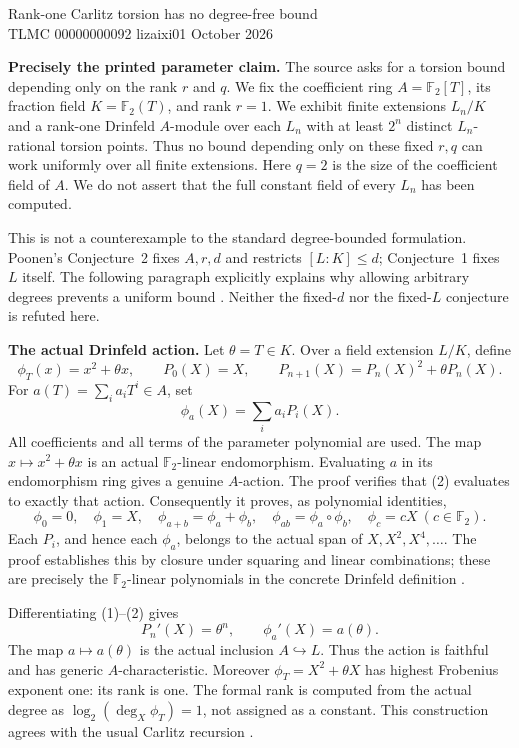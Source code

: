\documentclass[10pt,a4paper]{article}
\begin{document}
\begin{center}
{\Large Rank-one Carlitz torsion has no degree-free bound}\\[4pt]
TLMC 00000000092 \quad lizaixi01  October 2026
\end{center}

\textbf{Precisely the printed parameter claim.}
The source asks for a torsion bound depending only on the rank $r$ and $q$.
We fix the coefficient ring $A=\mathbb F_2[T]$, its fraction field
$K=\mathbb F_2(T)$, and rank $r=1$. We exhibit finite extensions $L_n/K$
and a rank-one Drinfeld $A$-module over each $L_n$ with at least $2^n$
distinct $L_n$-rational torsion points. Thus no bound depending only on
these fixed $r,q$ can work uniformly over all finite extensions.
Here $q=2$ is the size of the coefficient field of $A$. We do not assert
that the full constant field of every $L_n$ has been computed.

This is not a counterexample to the standard degree-bounded formulation.
Poonen's Conjecture~2 fixes $A,r,d$ and restricts $[L:K]\le d$;
Conjecture~1 fixes $L$ itself. The following paragraph explicitly explains
why allowing arbitrary degrees prevents a uniform bound \cite{torsion}.
Neither the fixed-$d$ nor the fixed-$L$ conjecture is refuted here.

\textbf{The actual Drinfeld action.}
Let $\theta=T\in K$. Over a field extension $L/K$, define
\[
 \phi_T(x)=x^2+\theta x,\qquad
 P_0(X)=X,\qquad P_{n+1}(X)=P_n(X)^2+\theta P_n(X).
 \tag{1}
\]
For $a(T)=\sum_i a_iT^i\in A$, set
\[
 \phi_a(X)=\sum_i a_i P_i(X). \tag{2}
\]
All coefficients and all terms of the parameter polynomial are used.
The map $x\mapsto x^2+\theta x$ is an actual $\mathbb F_2$-linear
endomorphism. Evaluating $a$ in its endomorphism ring gives a genuine
$A$-action. The proof verifies that (2) evaluates to exactly that action.
Consequently it proves, as polynomial identities,
\[
 \phi_0=0,\quad \phi_1=X,\quad
 \phi_{a+b}=\phi_a+\phi_b,\quad
 \phi_{ab}=\phi_a\circ\phi_b,\quad \phi_c=cX\ (c\in\mathbb F_2).
\]
Each $P_i$, and hence each $\phi_a$, belongs to the actual span of
$X,X^2,X^4,\ldots$. The proof establishes this by closure under squaring
and linear combinations; these are precisely the $\mathbb F_2$-linear
polynomials in the concrete Drinfeld definition \cite{introduction}.

Differentiating (1)--(2) gives
\[
 P_n'(X)=\theta^n,\qquad \phi_a'(X)=a(\theta). \tag{3}
\]
The map $a\mapsto a(\theta)$ is the actual inclusion $A\hookrightarrow L$.
Thus the action is faithful and has generic $A$-characteristic.
Moreover $\phi_T=X^2+\theta X$ has highest Frobenius exponent one:
its rank is one. The formal rank is computed from the actual degree
as $\log_2(\deg_X\phi_T)=1$, not assigned as a constant.
This construction agrees with the usual Carlitz recursion \cite{carlitz}.
\end{document}
